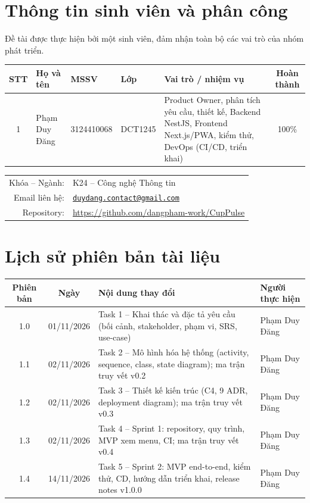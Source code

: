 \documentclass[a4paper]{article}
\newcommand{\code}[1]{\texttt{#1}}
\newcommand{\thead}{\rowcolor{headgray}}
\begin{document}
\thispagestyle{empty}
\newpage

\section*{Thông tin sinh viên và phân công}

Đề tài được thực hiện bởi một sinh viên, đảm nhận toàn bộ các vai trò của nhóm phát triển.

\begin{center}
\begin{tabularx}{\textwidth}{|c|l|l|l|X|c|}
\hline
\thead \textbf{STT} & \textbf{Họ và tên} & \textbf{MSSV} & \textbf{Lớp} & \textbf{Vai trò / nhiệm vụ} & \textbf{Hoàn thành} \\ \hline
1 & Phạm Duy Đăng & 3124410068 & DCT1245 & Product Owner, phân tích yêu cầu, thiết kế, Backend NestJS, Frontend Next.js/PWA, kiểm thử, DevOps (CI/CD, triển khai) & 100\% \\ \hline
\end{tabularx}
\end{center}

\begin{center}
\begin{tabular}{rl}
Khóa -- Ngành: & K24 -- Công nghệ Thông tin \\
Email liên hệ: & \href{mailto:duydang.contact@gmail.com}{\code{duydang.contact@gmail.com}} \\
Repository: & \url{https://github.com/dangpham-work/CupPulse} \\
\end{tabular}
\end{center}

\section*{Lịch sử phiên bản tài liệu}

\begin{center}
\begin{tabularx}{\textwidth}{|c|c|X|l|}
\hline
\thead \textbf{Phiên bản} & \textbf{Ngày} & \textbf{Nội dung thay đổi} & \textbf{Người thực hiện} \\ \hline
1.0 & 01/11/2026 & Task 1 -- Khai thác và đặc tả yêu cầu (bối cảnh, stakeholder, phạm vi, SRS, use-case) & Phạm Duy Đăng \\ \hline
1.1 & 02/11/2026 & Task 2 -- Mô hình hóa hệ thống (activity, sequence, class, state diagram); ma trận truy vết v0.2 & Phạm Duy Đăng \\ \hline
1.2 & 02/11/2026 & Task 3 -- Thiết kế kiến trúc (C4, 9 ADR, deployment diagram); ma trận truy vết v0.3 & Phạm Duy Đăng \\ \hline
1.3 & 02/11/2026 & Task 4 -- Sprint 1: repository, quy trình, MVP xem menu, CI; ma trận truy vết v0.4 & Phạm Duy Đăng \\ \hline
1.4 & 14/11/2026 & Task 5 -- Sprint 2: MVP end-to-end, kiểm thử, CD, hướng dẫn triển khai, release notes v1.0.0 & Phạm Duy Đăng \\ \hline
\end{tabularx}
\end{center}
\end{document}
